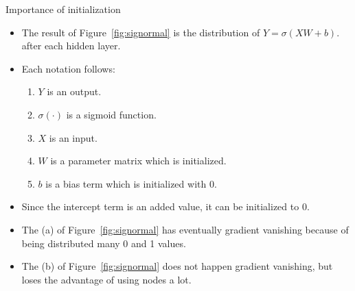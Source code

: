 \documentclass{beamer}
\begin{document}
	\begin{frame}{Importance of initialization}
		\begin{itemize}
			\item The result of Figure~\ref{fig:signormal} is the distribution of $Y = \sigma(XW + b).$ after each hidden layer.
			\item Each notation follows:
			\begin{enumerate}
				\vspace{3pt}
				\item $Y$ is an output.
				\item $\sigma(\cdot)$ is a sigmoid function.
				\item $X$ is an input.
				\item $W$ is a parameter matrix which is initialized.
				\item $b$ is a bias term which is initialized with 0.
				\vspace{3pt}
			\end{enumerate}	
			\item Since the intercept term is an added value, it can be initialized to 0.
			\item The (a) of Figure~\ref{fig:signormal} has eventually gradient vanishing because of being distributed many 0 and 1 values.
			\item The (b) of Figure~\ref{fig:signormal} does not happen gradient vanishing, but loses the advantage of using nodes a lot.
		\end{itemize}
	\end{frame}	
\end{document}
